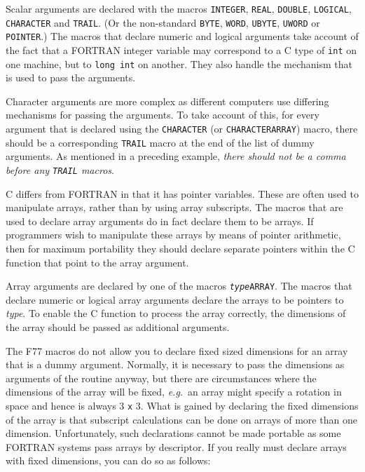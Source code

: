 \documentclass[twoside,11pt]{article}
\newcommand{\htmlref}[2]{#1}
\renewcommand{\_}{\texttt{\symbol{95}}}
\begin{document}
Scalar arguments are declared with the macros \texttt{INTEGER}, \texttt{REAL},
\texttt{DOUBLE}, \texttt{LOGICAL}, \texttt{CHARACTER} and \texttt{TRAIL}.
(Or the non-standard \texttt{BYTE}, \texttt{WORD}, \texttt{UBYTE}, 
\texttt{UWORD} or \texttt{POINTER}.)
The macros that declare numeric and logical arguments take account of the fact
that a FORTRAN integer variable may correspond to a C type of \texttt{int} on 
one machine, but to \texttt{long int} on another. 
They also handle the mechanism that is used to pass the arguments.

Character arguments are more complex as different computers use differing
mechanisms for passing the arguments. To take account of this, for every
argument that is declared using the 
\htmlref{\texttt{CHARACTER}}{CHARACTER}
(or 
\htmlref{\texttt{CHARACTER\_ARRAY}}{CHARACTER_ARRAY})
macro, there should be a corresponding 
\htmlref{\texttt{TRAIL}}{TRAIL}
macro at the end of the list of dummy arguments. 
As mentioned in a preceding example, \textit{there should not be a comma before 
any \texttt{TRAIL} macros}.

C differs from FORTRAN in that it has pointer variables. These are often used to
manipulate arrays, rather than by using array subscripts. The macros that are
used to declare array arguments do in fact declare them to be arrays. 
If programmers wish to manipulate these arrays by means of pointer arithmetic,
then for maximum portability they should declare separate pointers within the C
function that point to the array argument.

Array arguments are declared by one of the macros 
\htmlref{\texttt{\textit{type}\_ARRAY}}{type_ARRAY}.
The macros that declare numeric or
logical array arguments declare the arrays to be pointers to \textit{type}.
To enable the C function to process the array correctly,
the dimensions of the array should be passed as additional arguments.

The F77 macros do not allow you to declare fixed sized dimensions for an array
that is a dummy argument. Normally, it is necessary to pass the dimensions as
arguments of the routine anyway, but there are circumstances where the
dimensions of the array will be fixed, \textit{e.g.}\ an array might specify a 
rotation in space and hence is always 3 \texttt{x} 3. 
What is gained by declaring the
fixed dimensions of the array is that subscript calculations can be done on
arrays of more than one dimension. Unfortunately, such declarations cannot be
made portable as some FORTRAN systems pass arrays by descriptor. If you really
must declare arrays with fixed dimensions, you can do so as follows:
\end{document}
